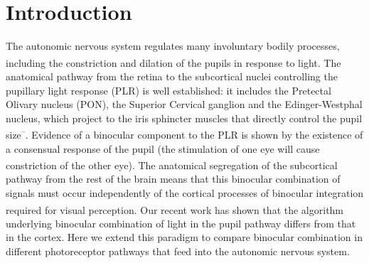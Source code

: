 \documentclass[
]{article}
\begin{document}
\section{Introduction}\label{introduction}

The autonomic nervous system regulates many involuntary bodily processes, including the constriction and dilation of the pupils in response to light\textsuperscript{}. The anatomical pathway from the retina to the subcortical nuclei controlling the pupillary light response (PLR) is well established: it includes the Pretectal Olivary nucleus (PON), the Superior Cervical ganglion and the Edinger-Westphal nucleus, which project to the iris sphincter muscles that directly control the pupil size\textsuperscript{--}. Evidence of a binocular component to the PLR is shown by the existence of a consensual response of the pupil (the stimulation of one eye will cause constriction of the other eye)\textsuperscript{}. The anatomical segregation of the subcortical pathway from the rest of the brain means that this binocular combination of signals must occur independently of the cortical processes of binocular integration required for visual perception. Our recent work\textsuperscript{} has shown that the algorithm underlying binocular combination of light in the pupil pathway differs from that in the cortex. Here we extend this paradigm to compare binocular combination in different photoreceptor pathways that feed into the autonomic nervous system.
\end{document}
